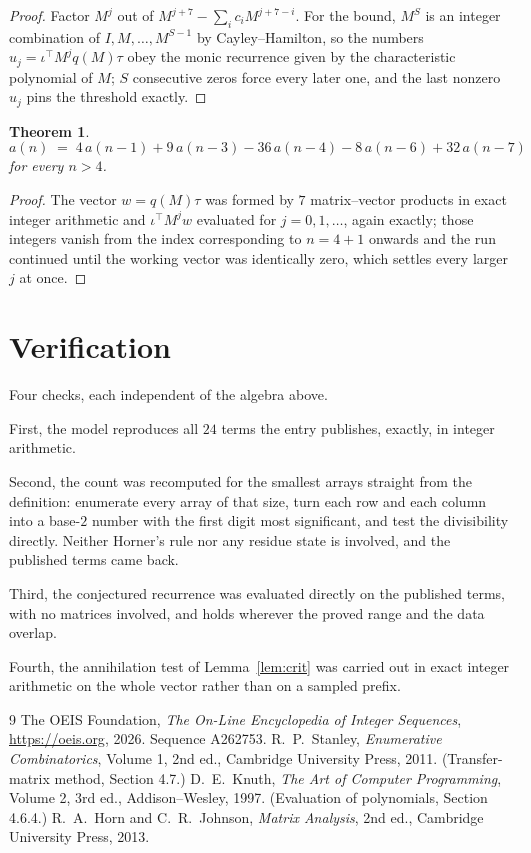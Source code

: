 \documentclass[11pt,a4paper]{article}
\theoremstyle{plain}
\newtheorem{theorem}{Theorem}
\theoremstyle{definition}
\begin{document}
\begin{proof}
Factor $M^{j}$ out of $M^{j+7}-\sum_ic_iM^{j+7-i}$. For the bound, $M^{S}$
is an integer combination of $I,M,\dots,M^{S-1}$ by Cayley--Hamilton, so the numbers
$u_j=\iota^{\!\top}M^{j}q(M)\tau$ obey the monic recurrence given by the characteristic
polynomial of $M$; $S$ consecutive zeros force every later one, and the last nonzero $u_j$
pins the threshold exactly.
\end{proof}

\begin{theorem}
\[
a(n)\;=\;4\,a(n-1) + 9\,a(n-3) - 36\,a(n-4) - 8\,a(n-6) + 32\,a(n-7)
\]
for every $n>4$.
\end{theorem}

\begin{proof}
The vector $w=q(M)\tau$ was formed by $7$ matrix--vector products in exact integer
arithmetic and $\iota^{\!\top}M^{j}w$ evaluated for $j=0,1,\dots$, again exactly; those
integers vanish from the index corresponding to $n=4+1$ onwards and the run continued
until the working vector was identically zero, which settles every larger $j$ at once.
\end{proof}

\section{Verification}

Four checks, each independent of the algebra above.

First, the model reproduces all $24$ terms the entry publishes, exactly, in integer
arithmetic.

Second, the count was recomputed for the smallest arrays straight from the definition:
enumerate every array of that size, turn each row and each column into a base-$2$ number with
the first digit most significant, and test the divisibility directly. Neither Horner's rule nor
any residue state is involved, and the published terms came back.

Third, the conjectured recurrence was evaluated directly on the published terms, with no
matrices involved, and holds wherever the proved range and the data overlap.

Fourth, the annihilation test of Lemma~\ref{lem:crit} was carried out in exact integer
arithmetic on the whole vector rather than on a sampled prefix.

\begin{thebibliography}{9}
 The OEIS Foundation, \emph{The On-Line Encyclopedia of Integer
Sequences}, \url{https://oeis.org}, 2026. Sequence A262753.
 R.~P.~Stanley, \emph{Enumerative Combinatorics}, Volume 1, 2nd ed.,
Cambridge University Press, 2011. (Transfer-matrix method, Section 4.7.)
 D.~E.~Knuth, \emph{The Art of Computer Programming}, Volume 2, 3rd ed.,
Addison--Wesley, 1997. (Evaluation of polynomials, Section 4.6.4.)
 R.~A.~Horn and C.~R.~Johnson, \emph{Matrix Analysis}, 2nd ed., Cambridge
University Press, 2013.
\end{thebibliography}
\end{document}
